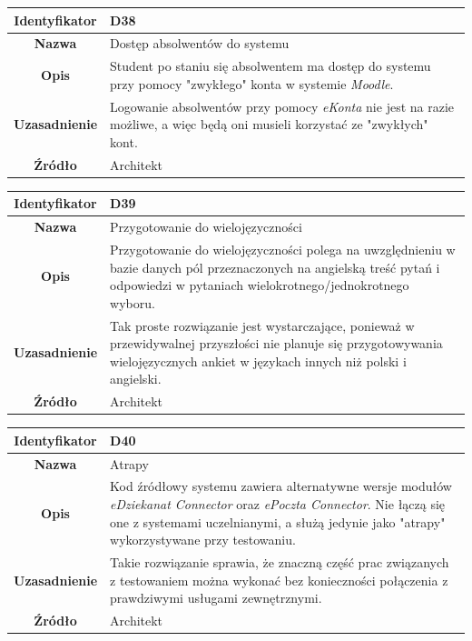 \begin{table}[H]
\centering
\begin{tabular}{ | >{\bfseries}c | p{11cm} | }
\hline
%
Identyfikator & D38 \\ \hline
Nazwa & Dostęp absolwentów do systemu \\ \hline
Opis & Student po staniu się absolwentem ma dostęp do systemu przy pomocy "zwykłego" konta w systemie \textit{Moodle}. \\ \hline
Uzasadnienie & Logowanie absolwentów przy pomocy \textit{eKonta} nie jest na razie możliwe, a więc będą oni musieli korzystać ze "zwykłych" kont. \\ \hline
Źródło & Architekt \\ \hline
%
\end{tabular}
\end{table}

\begin{table}[H]
\centering
\begin{tabular}{ | >{\bfseries}c | p{11cm} | }
\hline
%
Identyfikator & D39 \\ \hline
Nazwa & Przygotowanie do wielojęzyczności \\ \hline
Opis & Przygotowanie do wielojęzyczności polega na uwzględnieniu w bazie danych pól przeznaczonych na angielską treść pytań i odpowiedzi w pytaniach wielokrotnego/jednokrotnego wyboru. \\ \hline
Uzasadnienie & Tak proste rozwiązanie jest wystarczające, ponieważ w przewidywalnej przyszłości nie planuje się przygotowywania wielojęzycznych ankiet w językach innych niż polski i angielski. \\ \hline
Źródło & Architekt \\ \hline
%
\end{tabular}
\end{table}

\begin{table}[H]
\centering
\begin{tabular}{ | >{\bfseries}c | p{11cm} | }
\hline
%
Identyfikator & D40 \\ \hline
Nazwa & Atrapy \\ \hline
Opis & Kod źródłowy systemu zawiera alternatywne wersje modułów \textit{eDziekanat Connector} oraz \textit{ePoczta Connector}. Nie łączą się one z systemami uczelnianymi, a służą jedynie jako "atrapy" wykorzystywane przy testowaniu. \\ \hline
Uzasadnienie &  Takie rozwiązanie sprawia, że znaczną część prac związanych z testowaniem można wykonać bez konieczności połączenia z prawdziwymi usługami zewnętrznymi. \\ \hline
Źródło & Architekt \\ \hline
%
\end{tabular}
\end{table}

